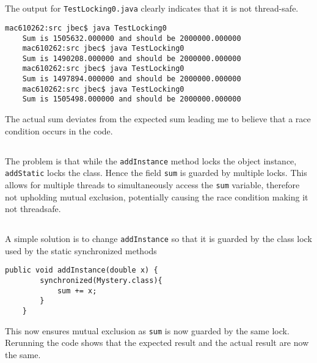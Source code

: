 \documentclass{ituhandin}
\begin{document}
\maketitlepage
\signpage

\chapter{} %

\section{}
The output for \texttt{TestLocking0.java} clearly indicates that it is not thread-safe.
\begin{lstlisting}[language={}, frame={}]
    mac610262:src jbec$ java TestLocking0
    Sum is 1505632.000000 and should be 2000000.000000
    mac610262:src jbec$ java TestLocking0
    Sum is 1490208.000000 and should be 2000000.000000
    mac610262:src jbec$ java TestLocking0
    Sum is 1497894.000000 and should be 2000000.000000
    mac610262:src jbec$ java TestLocking0
    Sum is 1505498.000000 and should be 2000000.000000
\end{lstlisting}

The actual sum deviates from the expected sum leading me to believe that a race condition occurs in the code.

\section{}
The problem is that while the \texttt{addInstance} method locks the object instance, \texttt{addStatic} locks the class. Hence the field \texttt{sum} is guarded by multiple locks. This allows for multiple threads to simultaneously access the \texttt{sum} variable, therefore not upholding mutual exclusion, potentially causing the race condition making it not threadsafe.

\section{}
A simple solution is to change \texttt{addInstance} so that it is guarded by the class lock used by the static synchronized methods
\begin{lstlisting}[frame={}]
    public void addInstance(double x) {
        synchronized(Mystery.class){
            sum += x;
        }
    }
\end{lstlisting}
This now ensures mutual exclusion as \texttt{sum} is now guarded by the same lock. Rerunning the code shows that the expected result and the actual result are now the same.
\end{document}
